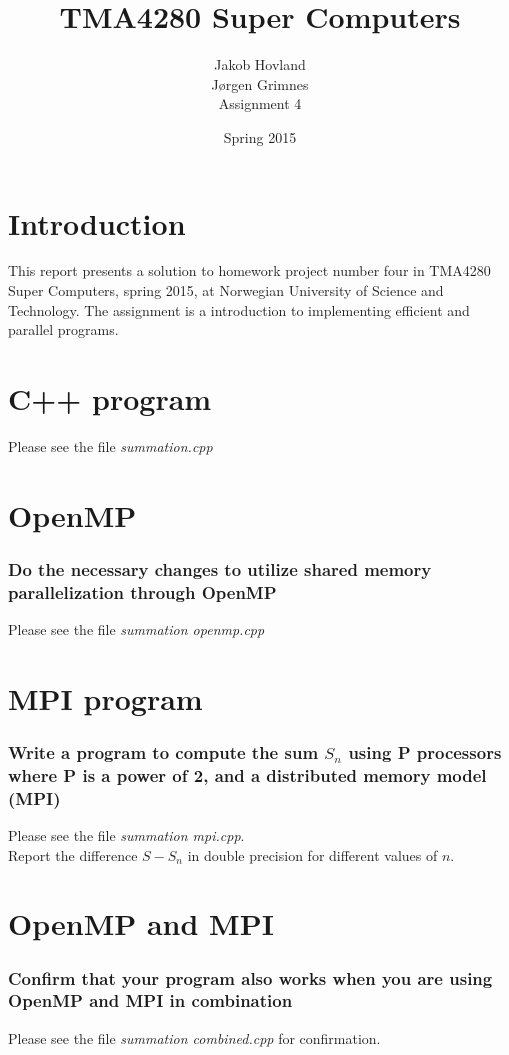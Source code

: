 \documentclass[a4paper]{article} %
\title{TMA4280 Super Computers}
\author{Jakob Hovland\\Jørgen Grimnes\\Assignment 4}
\date{Spring 2015}
\begin{document}
	\maketitle
   \pagebreak
   
   \section{Introduction}
   This report presents a solution to homework project number four in TMA4280 Super Computers, spring 2015, at Norwegian University of Science and Technology. The assignment is a introduction to implementing efficient and parallel programs.
   
   \section{C++ program}
   Please see the file \emph{summation.cpp}
      
   \section{OpenMP}
   \subsubsection*{Do the necessary changes to utilize shared memory parallelization through
OpenMP}
   Please see the file \emph{summation openmp.cpp}
   
   \section{MPI program}
   \subsubsection*{Write a program to compute the sum $S_n$ using P processors where P is a power of 2, and a distributed memory model (MPI)}
   Please see the file \emph{summation mpi.cpp}.\\
   Report the difference $S - S_n$ in double precision for different values of $n$.
   
   \section{OpenMP and MPI}
   \subsubsection*{Confirm that your program also works when you are using OpenMP and MPI in combination}
   Please see the file \emph{summation combined.cpp} for confirmation.
   
\end{document}
